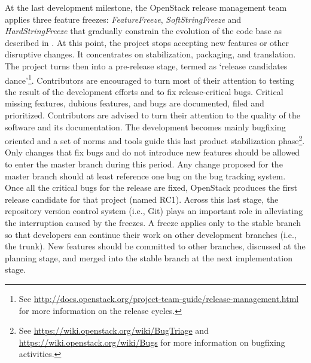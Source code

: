 \documentclass[dvipsnames]{interact}
\theoremstyle{plain}\newtheorem{theorem}{Theorem}[section]
\theoremstyle{definition}
\theoremstyle{remark}
\begin{document}
At the last development milestone, the OpenStack release management team applies three feature freezes:  \emph{FeatureFreeze}, \emph{SoftStringFreeze} and \emph{HardStringFreeze} that gradually constrain the evolution of the code base as described in . At this point, the project stops accepting new features or other disruptive changes. It concentrates on stabilization, packaging, and translation. The project turns then into a pre-release stage, termed as `release candidates dance'\footnote{See \url{http://docs.openstack.org/project-team-guide/release-management.html} for more information on the release cycles.}. Contributors are encouraged to turn most of their attention to testing the result of the development efforts and to fix release-critical bugs. Critical missing features, dubious features, and bugs are documented, filed and prioritized. Contributors are advised to turn their attention to the quality of the software and its documentation. The development becomes mainly bugfixing oriented and a set of norms and tools guide this last product stabilization phase\footnote{See \url{https://wiki.openstack.org/wiki/BugTriage} and \url{https://wiki.openstack.org/wiki/Bugs} for more information on bugfixing activities.}. 
Only changes that fix bugs and do not introduce new features should be allowed to enter the master branch during this period.
Any change proposed for the master branch should at least reference one bug on the bug tracking system. Once all the critical bugs for the release are fixed, OpenStack produces the first release candidate for that project (named RC1). Across this last stage, the repository version control system (i.e., Git) plays an important role in alleviating the interruption caused by the freezes. A freeze applies only to the stable branch so that developers can continue their work on other development branches (i.e., the trunk). New features should be committed to other branches, discussed at the  planning stage, and merged into the stable branch at the next implementation stage.
\end{document}
